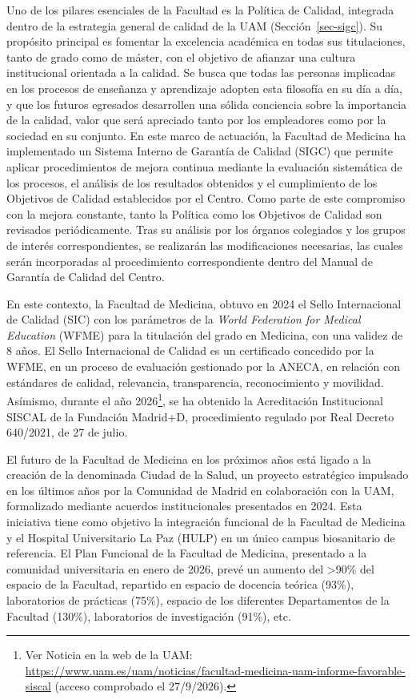 \documentclass[
  11pt,
  a4paper,
  twoside]{scrreprt}
\begin{document}
Uno de los pilares esenciales de la Facultad es la Política de Calidad,
integrada dentro de la estrategia general de calidad de la UAM
(Sección~\ref{sec-sigc}). Su propósito principal es fomentar la
excelencia académica en todas sus titulaciones, tanto de grado como de
máster, con el objetivo de afianzar una cultura institucional orientada
a la calidad. Se busca que todas las personas implicadas en los procesos
de enseñanza y aprendizaje adopten esta filosofía en su día a día, y que
los futuros egresados desarrollen una sólida conciencia sobre la
importancia de la calidad, valor que será apreciado tanto por los
empleadores como por la sociedad en su conjunto. En este marco de
actuación, la Facultad de Medicina ha implementado un Sistema Interno de
Garantía de Calidad (SIGC) que permite aplicar procedimientos de mejora
continua mediante la evaluación sistemática de los procesos, el análisis
de los resultados obtenidos y el cumplimiento de los Objetivos de
Calidad establecidos por el Centro. Como parte de este compromiso con la
mejora constante, tanto la Política como los Objetivos de Calidad son
revisados periódicamente. Tras su análisis por los órganos colegiados y
los grupos de interés correspondientes, se realizarán las modificaciones
necesarias, las cuales serán incorporadas al procedimiento
correspondiente dentro del Manual de Garantía de Calidad del Centro.

En este contexto, la Facultad de Medicina, obtuvo en 2024 el Sello
Internacional de Calidad (SIC) con los parámetros de la \emph{World
Federation for Medical Education} (WFME) para la titulación del grado en
Medicina, con una validez de 8 años. El Sello Internacional de Calidad
es un certificado concedido por la WFME, en un proceso de evaluación
gestionado por la ANECA, en relación con estándares de calidad,
relevancia, transparencia, reconocimiento y movilidad. Asímismo, durante
el año 2026\footnote{Ver Noticia en la web de la UAM:
  \url{https://www.uam.es/uam/noticias/facultad-medicina-uam-informe-favorable-siscal}
  (acceso comprobado el 27/9/2026).}, se ha obtenido la Acreditación
Institucional SISCAL de la Fundación Madrid+D, procedimiento regulado
por Real Decreto 640/2021, de 27 de julio.

El futuro de la Facultad de Medicina en los próximos años está ligado a
la creación de la denominada Ciudad de la Salud, un proyecto estratégico
impulsado en los últimos años por la Comunidad de Madrid en colaboración
con la UAM, formalizado mediante acuerdos institucionales presentados en
2024. Esta iniciativa tiene como objetivo la integración funcional de la
Facultad de Medicina y el Hospital Universitario La Paz (HULP) en un
único campus biosanitario de referencia. El Plan Funcional de la
Facultad de Medicina, presentado a la comunidad universitaria en enero
de 2026, prevé un aumento del \textgreater90\% del espacio de la
Facultad, repartido en espacio de docencia teórica (93\%), laboratorios
de prácticas (75\%), espacio de los diferentes Departamentos de la
Facultad (130\%), laboratorios de investigación (91\%), etc.
\end{document}
